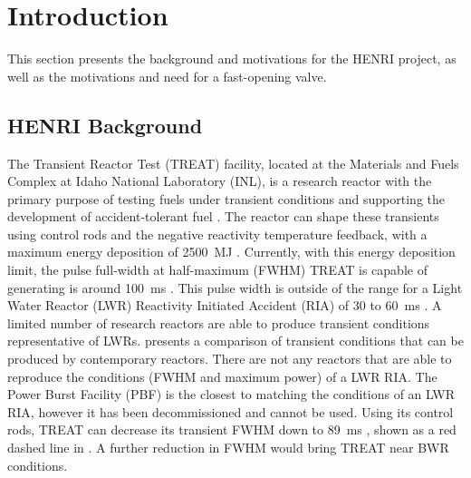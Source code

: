 \section{Introduction} \label{s:intro}
This section presents the background and motivations for the HENRI project, as well as the motivations and need for a fast-opening valve.

\subsection{HENRI Background} \label{ss:henri background}
The Transient Reactor Test (TREAT) facility, located at the Materials and Fuels Complex at Idaho National Laboratory (INL), is a research reactor with the primary purpose of testing fuels under transient conditions and supporting the development of accident-tolerant fuel \cite{CINBIZ2017}. The reactor can shape these transients using control rods and the negative reactivity temperature feedback, with a maximum energy deposition of \SI{2500}{\mega\joule} \cite{Holschuh2019}. Currently, with this energy deposition limit, the pulse full-width at half-maximum (FWHM) TREAT is capable of generating is around \SI{100}{\milli\second} \cite{Holschuh2019}. This pulse width is outside of the range for a Light Water Reactor (LWR) Reactivity Initiated Accident (RIA) of 30 to \SI{60}{\milli\second} \cite{NEA2010}. A limited number of research reactors are able to produce transient conditions representative of LWRs.  presents a comparison of transient conditions that can be produced by contemporary reactors. There are not any reactors that are able to reproduce the conditions (FWHM and maximum power) of a LWR RIA. The Power Burst Facility (PBF) is the closest to matching the conditions of an LWR RIA, however it has been decommissioned and cannot be used. Using its control rods, TREAT can decrease its transient FWHM down to \SI{89}{\milli\second} \cite{NEA2010}, shown as a red dashed line in . A further reduction in FWHM would bring TREAT near BWR conditions.



